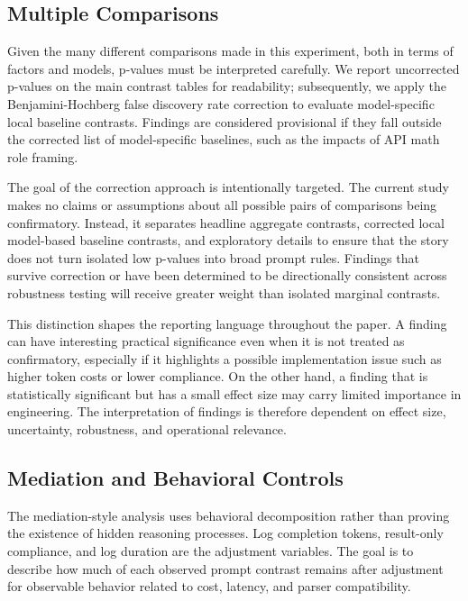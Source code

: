 \documentclass{llncs}
\begin{document}
\subsection{Multiple Comparisons}\label{multiple-comparisons}

Given the many different comparisons made in this experiment, both in terms of factors and models, p-values must be interpreted carefully. We report uncorrected p-values on the main contrast tables for readability; subsequently, we apply the Benjamini-Hochberg false discovery rate correction to evaluate model-specific local baseline contrasts. Findings are considered provisional if they fall outside the corrected list of model-specific baselines, such as the impacts of API math role framing.

The goal of the correction approach is intentionally targeted. The current study makes no claims or assumptions about all possible pairs of comparisons being confirmatory. Instead, it separates headline aggregate contrasts, corrected local model-based baseline contrasts, and exploratory details to ensure that the story does not turn isolated low p-values into broad prompt rules. Findings that survive correction or have been determined to be directionally consistent across robustness testing will receive greater weight than isolated marginal contrasts.

This distinction shapes the reporting language throughout the paper. A finding can have interesting practical significance even when it is not treated as confirmatory, especially if it highlights a possible implementation issue such as higher token costs or lower compliance. On the other hand, a finding that is statistically significant but has a small effect size may carry limited importance in engineering. The interpretation of findings is therefore dependent on effect size, uncertainty, robustness, and operational relevance.

\subsection{Mediation and Behavioral Controls}\label{mediation-and-behavioral-controls}

The mediation-style analysis uses behavioral decomposition rather than proving the existence of hidden reasoning processes. Log completion tokens, result-only compliance, and log duration are the adjustment variables. The goal is to describe how much of each observed prompt contrast remains after adjustment for observable behavior related to cost, latency, and parser compatibility.
\end{document}
